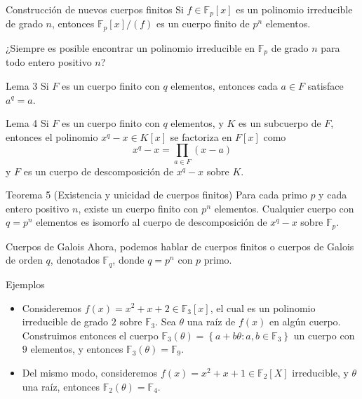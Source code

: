 \documentclass[presentation]{beamer}
\newcommand{\F}{\mathds{F}}
\begin{document}
\begin{frame}
  \begin{block}{Construcción de nuevos cuerpos finitos}
    Si $f \in \F_p[x]$ es un polinomio irreducible de grado $n$, entonces $\F_p[x]/(f)$ es un cuerpo finito de $p^n$ elementos.

    \vspace{2em}
    ¿Siempre es posible encontrar un polinomio irreducible en $\F_p$ de grado $n$ para todo entero positivo $n$?
  \end{block}
\end{frame}

\begin{frame}
  \begin{block}{Lema 3}
    Si $F$ es un cuerpo finito con $q$ elementos, entonces cada $a \in F$ satisface $a^q = a$.
  \end{block}
  \pause
  \begin{block}{Lema 4}
    Si $F$ es un cuerpo finito con $q$ elementos, y $K$ es un subcuerpo de $F$, entonces el polinomio $x^q - x \in K[x]$ se factoriza en $F[x]$ como 
    \begin{equation*}
      x^q - x = \prod_{a \in F} (x - a)
    \end{equation*}
    y $F$ es un cuerpo de descomposición de $x^q - x$ sobre $K$.
  \end{block}
\end{frame}

\begin{frame}
  \begin{block}{Teorema 5 (Existencia y unicidad de cuerpos finitos)}
    Para cada primo $p$ y cada entero positivo $n$, existe un cuerpo finito con $p^n$ elementos. Cualquier cuerpo con $q = p^n$ elementos es isomorfo al cuerpo de descomposición de $x^q - x$ sobre $\F_p$.
  \end{block}
  \pause
  \begin{block}{Cuerpos de Galois}
    Ahora, podemos hablar de cuerpos finitos o cuerpos de Galois de orden $q$, denotados $\F_q$, donde $q=p^n$ con $p$ primo.
  \end{block}
\end{frame}

\begin{frame}
  \begin{block}{Ejemplos}
    \begin{itemize}
      \item Consideremos $f(x) =   x^2 + x + 2 \in \F_3[x]$, el cual es un polinomio irreducible de grado $2$ sobre $\F_3$. Sea $\theta$ una raíz de $f(x)$ en algún cuerpo. Construimos entonces el cuerpo $\F_3(\theta) = \left\{a + b\theta: a,b \in \F_3 \right\}$ un cuerpo con $9$ elementos, y entonces $\F_3(\theta) = \F_9$.
      \pause
      \item Del mismo modo, consideremos $f(x) = x^2 + x + 1 \in \F_2[X]$ irreducible, y $\theta$ una raíz, entonces $\F_2(\theta) = \F_4$.
    \end{itemize}
  \end{block}
\end{frame}
\end{document}
